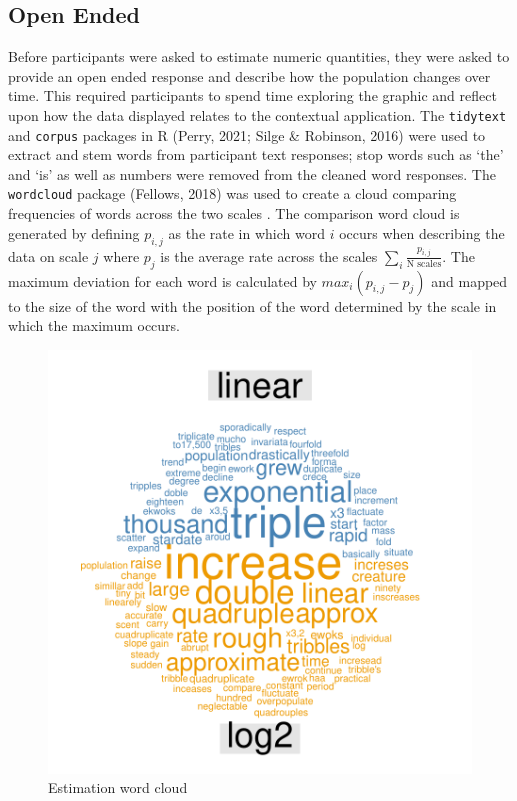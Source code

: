 \documentclass[print]{nuthesis}
\begin{document}
\hypertarget{open-ended}{%
\subsection{Open Ended}\label{open-ended}}

Before participants were asked to estimate numeric quantities, they were asked to provide an open ended response and describe how the population changes over time.
This required participants to spend time exploring the graphic and reflect upon how the data displayed relates to the contextual application.
The \texttt{tidytext} and \texttt{corpus} packages in R (Perry, 2021; Silge \& Robinson, 2016) were used to extract and stem words from participant text responses; stop words such as `the' and `is' as well as numbers were removed from the cleaned word responses.
The \texttt{wordcloud} package (Fellows, 2018) was used to create a cloud comparing frequencies of words across the two scales . The comparison word cloud is generated by defining \(p_{i,j}\) as the rate in which word \(i\) occurs when describing the data on scale \(j\) where \(p_j\) is the average rate across the scales \(\sum_i{\frac{p_{i,j}}{\text{N scales}}}\).
The maximum deviation for each word is calculated by \(max_i(p_{i,j} - p_j)\) and mapped to the size of the word with the position of the word determined by the scale in which the maximum occurs.

\begin{figure}[tbp]

{\centering \includegraphics[width=0.75\linewidth,]{thesis_files/figure-latex/estimation-word-cloud-1} 

}

\caption{Estimation word cloud}\label{fig:estimation-word-cloud}
\end{figure}
\end{document}
